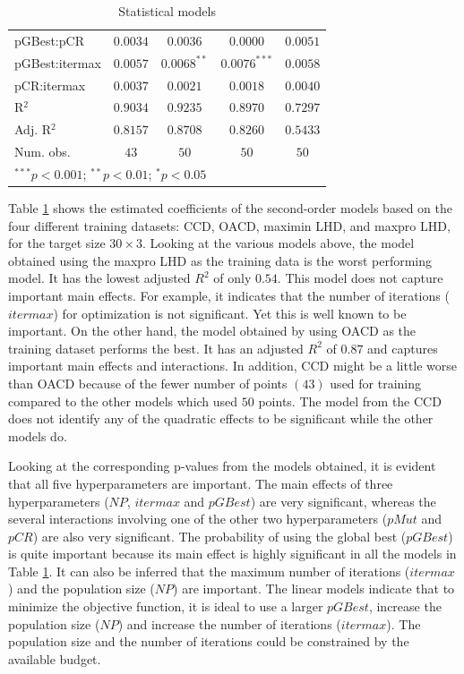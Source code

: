 \documentclass [PhD] {package/uclathes}
\begin{document}
\begin{table}
\begin{center}
\begin{tabular}{l c c c c}
pGBest:pCR     & $0.0034$        & $0.0036$        & $0.0000$        & $0.0051$        \\
pGBest:itermax & $0.0057$        & $0.0068^{**}$   & $0.0076^{***}$  & $0.0058$        \\
pCR:itermax    & $0.0037$        & $0.0021$        & $0.0018$        & $0.0040$        \\
\hline
R$^2$          & $0.9034$        & $0.9235$        & $0.8970$        & $0.7297$        \\
Adj. R$^2$     & $0.8157$        & $0.8708$        & $0.8260$        & $0.5433$        \\
Num. obs.      & $43$            & $50$            & $50$            & $50$            \\
\hline
\multicolumn{5}{l}{\scriptsize{$^{***}p<0.001$; $^{**}p<0.01$; $^{*}p<0.05$}}
\end{tabular}
\caption{Statistical models}
\label{table:coefficients}
\end{center}
\end{table}
Table \ref{table:coefficients} shows the estimated coefficients of the second-order models based on the four different training datasets: CCD, OACD, maximin LHD, and maxpro LHD, for the target size $30 \times 3$.
Looking at the various models above, the model obtained using the maxpro LHD as the training data is the worst performing model. It has the lowest adjusted $R^2$ of only $0.54$. This model does not capture important main effects. For example, it indicates that the number of iterations ($itermax$) for optimization is not significant. Yet this is well known to be important. On the other hand, the model obtained by using OACD as the training dataset performs the best. It has an adjusted $R^2$ of $0.87$ and captures important main effects and interactions. In addition, CCD might be a little worse than OACD because of the fewer number of points $(43)$ used for training compared to the other models which used $50$ points.
The model from the CCD does not identify any of the quadratic effects to be significant while the other models do.

Looking at the corresponding p-values from the models obtained, it is evident that all five hyperparameters are important. The main effects of three hyperparameters ($NP$, $itermax$ and $pGBest$) are very significant, whereas the several interactions involving one of the other two hyperparameters ($pMut$ and $pCR$) are also very significant.
The probability of using the global best ($pGBest$) is quite important because its main effect is highly significant in all the models in Table \ref{table:coefficients}. It can also be inferred that the maximum number of iterations ($itermax$) and the population size ($NP$) are important. The linear models indicate that to minimize the objective function, it is ideal to use a larger $pGBest$, increase the population size ($NP$) and increase the number of iterations ($itermax$). The population size and the number of iterations could be constrained by the available budget.
\end{document}
